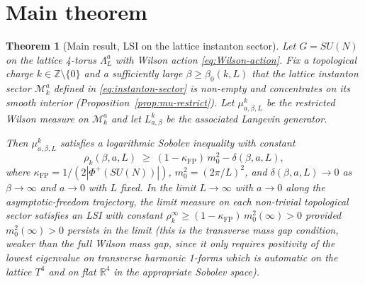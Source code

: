 \documentclass[11pt,a4paper]{amsart}
\newtheorem{theorem}{Theorem}[section]
\theoremstyle{definition}
\newcommand{\R}{\mathbb{R}}
\newcommand{\Z}{\mathbb{Z}}
\newcommand{\Mmod}{\mathcal{M}}
\newcommand{\kFP}{\kappa_{\mathrm{FP}}}
\begin{document}
\section{Main theorem}\label{sec:thm}

\begin{theorem}[Main result, LSI on the lattice instanton sector]
\label{thm:main}
Let $G = SU(N)$ on the lattice 4-torus $\Lambda_L^a$ with Wilson action
\eqref{eq:Wilson-action}. Fix a topological charge
$k\in\Z\setminus\{0\}$ and a sufficiently large $\beta\geq\beta_0(k,L)$
that the lattice instanton sector $\Mmod_k^a$ defined in
\eqref{eq:instanton-sector} is non-empty and concentrates on its smooth
interior (Proposition~\ref{prop:mu-restrict}). Let $\mu^k_{a,\beta,L}$
be the restricted Wilson measure on $\Mmod_k^a$ and let $L^k_{a,\beta}$
be the associated Langevin generator.

Then $\mu^k_{a,\beta,L}$ satisfies a logarithmic Sobolev inequality with
constant
\begin{equation}\label{eq:LSI-Mk}
\rho_k(\beta, a, L) \;\geq\; (1-\kFP)\,m_0^2 - \delta(\beta,a,L),
\end{equation}
where $\kFP = 1/(2|\Phi^+(SU(N))|)$, $m_0^2 = (2\pi/L)^2$, and
$\delta(\beta,a,L) \to 0$ as $\beta\to\infty$ and $a\to 0$ with $L$ fixed.
In the limit $L\to\infty$ with $a\to 0$ along the asymptotic-freedom
trajectory, the limit measure on each non-trivial topological sector
satisfies an LSI with constant $\rho_k^\infty \geq (1-\kFP)\,m_0^2(\infty) > 0$
provided $m_0^2(\infty) > 0$ persists in the limit (this is the
\emph{transverse mass gap} condition, weaker than the full Wilson
mass gap, since it only requires positivity of the lowest eigenvalue
on transverse harmonic 1-forms which is automatic on the lattice
$T^4$ and on flat $\R^4$ in the appropriate Sobolev space).
\end{theorem}
\end{document}
